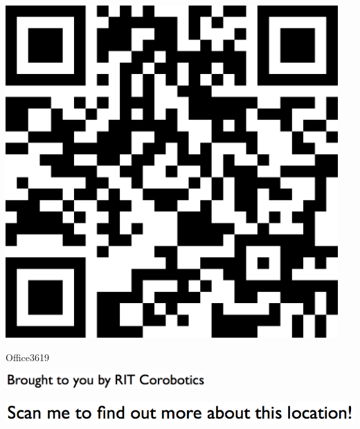 \documentclass[letterpaper]{article}
\begin{document}
 \begingroup 
 \centerline{\includegraphics[scale=1,width=5in,height=5in]{Office3619.png}} 
 \endgroup 
 \vspace*{\fill} 

 \hfill{\small Office3619} 

  \vspace{0.7in} 
 
 \centerline{\includegraphics[scale=1,width=3in]{text-bottom.png}} 
 
 \pagebreak 
{} 
 \vspace*{\fill} 
 
  \centerline{\includegraphics[scale=1,width=6in]{text-top.png}} 
 
 \vspace{0.5in} 
 
\end{document}
